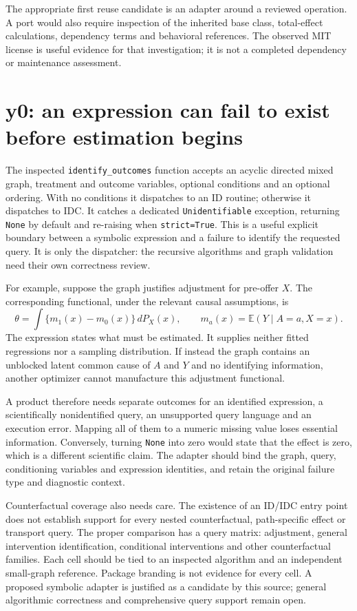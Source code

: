 The appropriate first reuse candidate is an adapter around a reviewed operation.
A port would also require inspection of the inherited base class, total-effect
calculations, dependency terms and behavioral references. The observed MIT
license is useful evidence for that investigation; it is not a completed
dependency or maintenance assessment.\cite{v13_sw_lingam}

\section{y0: an expression can fail to exist before estimation begins}

The inspected \texttt{identify\_outcomes} function accepts an acyclic directed
mixed graph, treatment and outcome variables, optional conditions and an optional
ordering. With no conditions it dispatches to an ID routine; otherwise it
dispatches to IDC. It catches a dedicated \texttt{Unidentifiable} exception,
returning \texttt{None} by default and re-raising when \texttt{strict=True}.
This is a useful explicit boundary between a symbolic expression and a failure
to identify the requested query. It is only the dispatcher: the recursive
algorithms and graph validation need their own correctness review.\cite{v13_sw_y0}

For example, suppose the graph justifies adjustment for pre-offer $X$. The
corresponding functional, under the relevant causal assumptions, is
\[
 \theta=\int\{m_1(x)-m_0(x)\}\,dP_X(x),
 \qquad m_a(x)=\mathbb E(Y\mid A=a,X=x).
\]
The expression states what must be estimated. It supplies neither fitted
regressions nor a sampling distribution. If instead the graph contains an
unblocked latent common cause of $A$ and $Y$ and no identifying information,
another optimizer cannot manufacture this adjustment functional.

A product therefore needs separate outcomes for an identified expression, a
scientifically nonidentified query, an unsupported query language and an
execution error. Mapping all of them to a numeric missing value loses essential
information. Conversely, turning \texttt{None} into zero would state that the
effect is zero, which is a different scientific claim. The adapter should bind
the graph, query, conditioning variables and expression identities, and retain
the original failure type and diagnostic context.

Counterfactual coverage also needs care. The existence of an ID/IDC entry point
does not establish support for every nested counterfactual, path-specific effect
or transport query. The proper comparison has a query matrix: adjustment,
general intervention identification, conditional interventions and other
counterfactual families. Each cell should be tied to an inspected algorithm and
an independent small-graph reference. Package branding is not evidence for every
cell. A proposed symbolic adapter is justified as a candidate by this source;
general algorithmic correctness and comprehensive query support remain open.

